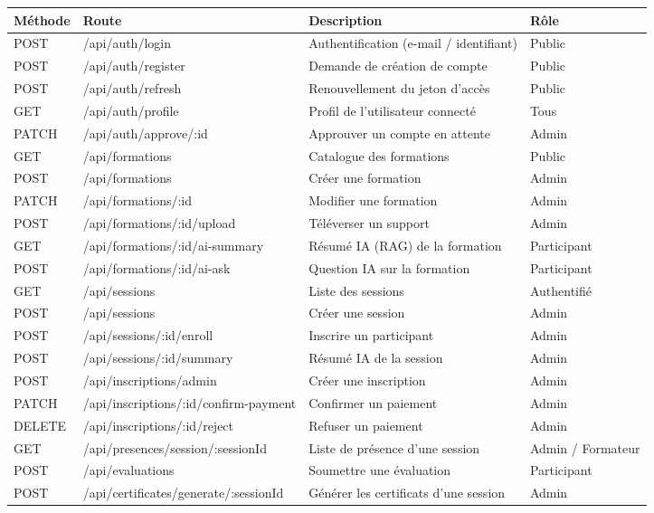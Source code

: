\documentclass[12pt,a4paper]{report}
\begin{document}
\begin{longtable}{|l|l|p{5.4cm}|p{2.2cm}|}
\hline
\textbf{Méthode} & \textbf{Route} & \textbf{Description} & \textbf{Rôle} \\
\hline
\endhead
POST & /api/auth/login & Authentification (e-mail / identifiant) & Public \\
\hline
POST & /api/auth/register & Demande de création de compte & Public \\
\hline
POST & /api/auth/refresh & Renouvellement du jeton d'accès & Public \\
\hline
GET & /api/auth/profile & Profil de l'utilisateur connecté & Tous \\
\hline
PATCH & /api/auth/approve/:id & Approuver un compte en attente & Admin \\
\hline
GET & /api/formations & Catalogue des formations & Public \\
\hline
POST & /api/formations & Créer une formation & Admin \\
\hline
PATCH & /api/formations/:id & Modifier une formation & Admin \\
\hline
POST & /api/formations/:id/upload & Téléverser un support & Admin \\
\hline
GET & /api/formations/:id/ai-summary & Résumé IA (RAG) de la formation & Participant \\
\hline
POST & /api/formations/:id/ai-ask & Question IA sur la formation & Participant \\
\hline
GET & /api/sessions & Liste des sessions & Authentifié \\
\hline
POST & /api/sessions & Créer une session & Admin \\
\hline
POST & /api/sessions/:id/enroll & Inscrire un participant & Admin \\
\hline
POST & /api/sessions/:id/summary & Résumé IA de la session & Admin \\
\hline
POST & /api/inscriptions/admin & Créer une inscription & Admin \\
\hline
PATCH & /api/inscriptions/:id/confirm-payment & Confirmer un paiement & Admin \\
\hline
DELETE & /api/inscriptions/:id/reject & Refuser un paiement & Admin \\
\hline
GET & /api/presences/session/:sessionId & Liste de présence d'une session & Admin / Formateur \\
\hline
POST & /api/evaluations & Soumettre une évaluation & Participant \\
\hline
POST & /api/certificates/generate/:sessionId & Générer les certificats d'une session & Admin \\

\end{longtable}
\end{document}
